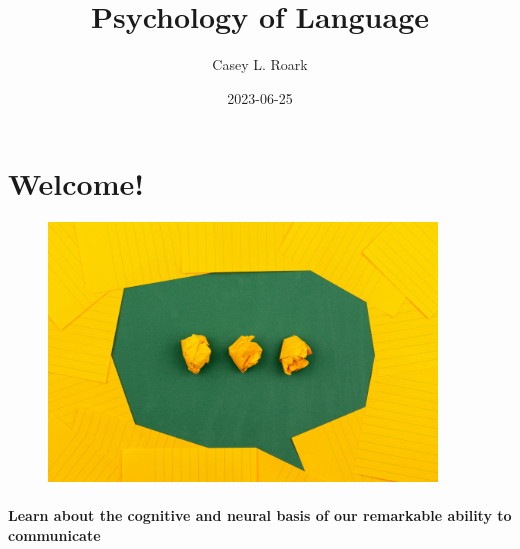 \documentclass[
  letterpaper,
  DIV=11,
  numbers=noendperiod]{scrreprt}
\title{Psychology of Language}
\author{Casey L. Roark}
\date{2023-06-25}
\renewcommand*\contentsname{Table of contents}
\newcommand\contentsname{Table of contents}
\begin{document}
\maketitle
\ifdefined\Shaded\renewenvironment{Shaded}{\begin{tcolorbox}[boxrule=0pt, breakable, sharp corners, interior hidden, frame hidden, enhanced, borderline west={3pt}{0pt}{shadecolor}]}{\end{tcolorbox}}\fi

\renewcommand*\contentsname{Table of contents}
{
\hypersetup{linkcolor=}
\setcounter{tocdepth}{2}
\tableofcontents
}

\hypertarget{welcome}{%
\chapter*{Welcome!}\label{welcome}}


\begin{figure}

{\centering \includegraphics[width=4.0625in,height=\textheight]{images/volodymyr-hryshchenko-V5vqWC9gyEU-unsplash.jpg}

}

\end{figure}

\hypertarget{learn-about-the-cognitive-and-neural-basis-of-our-remarkable-ability-to-communicate}{%
\subsubsection*{Learn about the cognitive and neural basis of our
remarkable ability to
communicate}\label{learn-about-the-cognitive-and-neural-basis-of-our-remarkable-ability-to-communicate}}
\end{document}
